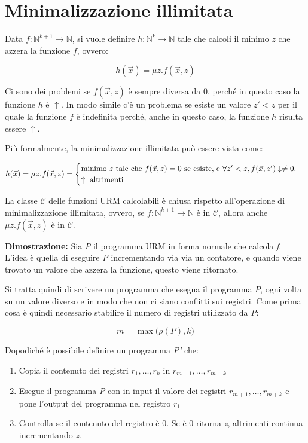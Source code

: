 \section{Minimalizzazione illimitata}\label{ex:minima}

Data $f : \mathbb{N}^{k+1} \rightarrow \mathbb{N}$, si vuole definire $h : \mathbb{N}^{k} \rightarrow \mathbb{N}$ tale che calcoli il minimo $z$ che azzera la funzione $f$, ovvero:

$$
h(\vec{x}) = \mu z . f(\vec{x},z)
$$

Ci sono dei problemi se $f(\vec{x},z)$ è sempre diversa da 0, perché in questo caso la funzione $h$ è $\uparrow$. In modo simile c'è un problema se esiste un valore $z' < z$ per il quale la funzione $f$ è indefinita perché, anche in questo caso, la funzione $h$ risulta essere $\uparrow$.

Più formalmente, la minimalizzazione illimitata può essere vista come:

$$
h(\vec{x}) = \mu z.f(\vec{x},z) = \begin{cases}
\text{minimo \textit{z} tale che }f(\vec{x},z) = 0 \text{ se esiste, e }\forall z' < z, f(\vec{x}, z') \downarrow \neq 0. \\
\uparrow \text{ altrimenti}
\end{cases}
$$

La classe $\mathcal{C}$ delle funzioni URM calcolabili è chiusa rispetto all'operazione di minimalizzazione illimitata, ovvero, se $f : \mathbb{N}^{k+1} \rightarrow \mathbb{N}$ è in $\mathcal{C}$, allora anche $\mu z . f(\vec{x},z)$ è in $\mathcal{C}$.

\textbf{Dimostrazione:} Sia \textit{P} il programma URM in forma normale che calcola \textit{f}. L'idea è quella di eseguire \textit{P} incrementando via via un contatore, e quando viene trovato un valore che azzera la funzione, questo viene ritornato.

Si tratta quindi di scrivere un programma che esegua il programma $P$, ogni volta su un valore diverso e in modo che non ci siano conflitti sui registri. Come prima cosa è quindi necessario stabilire il numero di registri utilizzato da \textit{P}:

$$
m = \max\big(\rho(P), k\big)
$$

Dopodiché è possibile definire un programma \textit{P'} che:

\begin{enumerate}
	\item Copia il contenuto dei registri $r_1, \ldots, r_k$ in $r_{m+1}, \ldots, r_{m+k}$
	\item Esegue il programma \textit{P} con in input il valore dei registri $r_{m+1}, \ldots, r_{m+k}$ e pone l'output del programma nel registro $r_1$
	\item Controlla se il contenuto del registro è 0. Se è 0 ritorna \textit{z}, altrimenti continua incrementando \textit{z}.
\end{enumerate}

